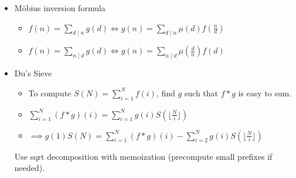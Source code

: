 \begin{itemize}
\item Möbius inversion formula

\begin{itemize}
  \item $f(n)=\sum_{d\mid n}g(d)\Leftrightarrow g(n)=\sum_{d\mid n}\mu(d)f(\frac{n}{d})$
  \item $f(n)=\sum_{n\mid d}g(d)\Leftrightarrow g(n)=\sum_{n\mid d}\mu(\frac{d}{n})f(d)$
\end{itemize}

\item Du's Sieve

\begin{itemize}
  \item To compute $S(N)=\sum_{i=1}^N f(i)$, find $g$ such that $f*g$ is easy to sum.
  \item $\sum_{i=1}^N (f*g)(i)=\sum_{i=1}^N g(i)S(\lfloor\frac{N}{i}\rfloor)$
  \item $\implies g(1)S(N)=\sum_{i=1}^N (f*g)(i)-\sum_{i=2}^N g(i)S(\lfloor\frac{N}{i}\rfloor)$
\end{itemize}
Use sqrt decomposition with memoization (precompute small prefixes if needed).
\end{itemize}

